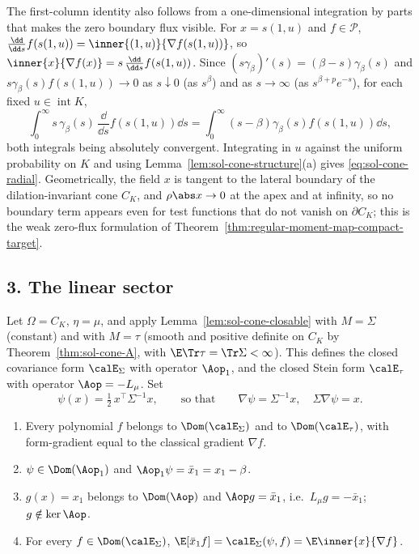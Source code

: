 \documentclass[../main.tex]{subfiles}
\begin{document}
\begin{remark}
\label{rem:sol-cone-radial}
The first-column identity also follows from a one-dimensional integration by parts that
makes the zero boundary flux visible.  For $x=s(1,u)$ and $f\in\mathscr P$,
$\frac{\dd}{\dd s}f(s(1,u))=\inner{(1,u)}{\nabla f(s(1,u))}$, so
$\inner{x}{\nabla f(x)}=s\,\frac{\dd}{\dd s}f(s(1,u))$.  Since
$(s\gamma_\beta)'(s)=(\beta-s)\gamma_\beta(s)$ and $s\gamma_\beta(s)f(s(1,u))\to0$ as
$s\downarrow0$ (as $s^\beta$) and as $s\to\infty$ (as $s^{\beta+p}e^{-s}$), for each fixed
$u\in\operatorname{int}K$,
\[
  \int_0^\infty s\,\gamma_\beta(s)\,\frac{\dd}{\dd s}f(s(1,u))\dd s
  =\int_0^\infty(s-\beta)\gamma_\beta(s)f(s(1,u))\dd s ,
\]
both integrals being absolutely convergent.  Integrating in $u$ against the uniform
probability on $K$ and using Lemma~\ref{lem:sol-cone-structure}(a) gives
\eqref{eq:sol-cone-radial}.  Geometrically, the field $x$ is tangent to the lateral boundary of
the dilation-invariant cone $C_K$, and $\rho\abs x\to0$ at the apex and at infinity, so no
boundary term appears even for test functions that do not vanish on $\partial C_K$; this is
the weak zero-flux formulation of Theorem~\ref{thm:regular-moment-map-compact-target}.
\end{remark}

\subsection*{3. The linear sector}
\label{subsec:sol-cone-linear}

Let $\Omega=C_K$, $\eta=\mu$, and apply Lemma~\ref{lem:sol-cone-closable} with $M=\Sigma$
(constant) and with $M=\tau$ (smooth and positive definite on $C_K$ by
Theorem~\ref{thm:sol-cone-A}, with $\E\Tr\tau=\Tr\Sigma<\infty$).  This defines the closed
covariance form $\calE_\Sigma$ with operator $\Aop_1$, and the closed Stein form
$\calE_\tau$ with operator $\Aop=-L_\mu$.  Set
\begin{equation}
  \psi(x)=\tfrac12\,x^\top\Sigma^{-1}x,\qquad\text{so that}\qquad \nabla\psi=\Sigma^{-1}x,
  \quad \Sigma\nabla\psi=x .
  \label{eq:sol-cone-psi}
\end{equation}

\begin{lemma}[Domains]
\label{lem:sol-cone-domains}
\begin{enumerate}[label=(\alph*),leftmargin=2.2em]
  \item Every polynomial $f$ belongs to $\Dom(\calE_\Sigma)$ and to $\Dom(\calE_\tau)$, with
  form-gradient equal to the classical gradient $\nabla f$.
  \item $\psi\in\Dom(\Aop_1)$ and $\Aop_1\psi=\bar x_1=x_1-\beta$.
  \item $g(x)=x_1$ belongs to $\Dom(\Aop)$ and $\Aop g=\bar x_1$, i.e.\ $L_\mu g=-\bar x_1$;
  $g\notin\ker\Aop$.
  \item For every $f\in\Dom(\calE_\Sigma)$,
  $\E[\bar x_1f]=\calE_\Sigma(\psi,f)=\E\inner{x}{\nabla f}$.
\end{enumerate}
\end{lemma}
\end{document}
